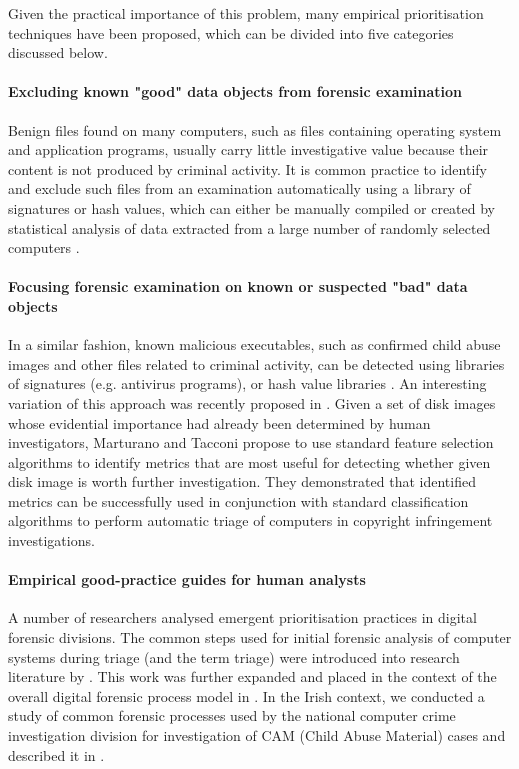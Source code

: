 \documentclass[10pt,a4paper]{article}
\begin{document}
Given the practical importance of this problem, many empirical prioritisation techniques have been proposed, which can be divided into five categories discussed below.

\paragraph{Excluding known "good" data objects from forensic examination}

Benign files found on many computers, such as files containing operating system and application programs, usually carry little investigative value because their content is not produced by criminal activity.  It is common practice to identify and exclude such files from an examination automatically using a library of signatures or hash values, which can either be manually compiled \cite{mead2006unique} or created by statistical analysis of data extracted from a large number of randomly selected computers \cite{rowe2014identifying}.

\paragraph{Focusing forensic examination on known or suspected "bad" data objects}

In a similar fashion, known malicious executables, such as confirmed child abuse images and other files related to criminal activity, can be detected using libraries of signatures (e.g. antivirus programs), or hash value libraries \cite{schell2007cyber}. An interesting variation of this approach was recently proposed in \cite{marturana2013machine}. Given a set of disk images whose evidential importance had already been determined by human investigators, Marturano and Tacconi propose to use standard feature selection algorithms to identify metrics that are most useful for detecting whether given disk image is worth further investigation.  They demonstrated that identified metrics can be successfully used in conjunction with standard classification algorithms to perform automatic triage of computers in copyright infringement investigations. 

\paragraph{Empirical good-practice guides for human analysts}

A number of researchers analysed emergent prioritisation practices in digital forensic divisions. The common steps used for initial forensic analysis of computer systems during triage (and the term triage) were introduced into research literature by \cite{rogers2006computer}. This work was further expanded and placed in the context of the overall digital forensic process model in \cite{casey2009investigation}.  In the Irish context, we conducted a study of common forensic processes used by the national computer crime investigation division for investigation of CAM (Child Abuse Material) cases and described it in \cite{james2014measuring}.
\end{document}
